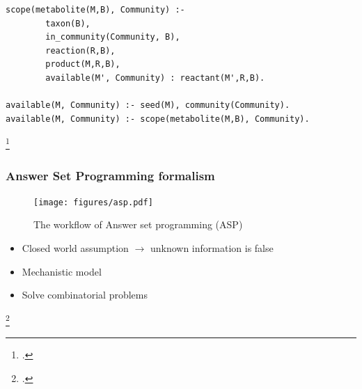 \documentclass[8pt,usenames,dvipsnames]{beamer}
\begin{document}
\begin{frame}[fragile]
\begin{onlyenv}
\begin{minipage}{0.55\textwidth}
\begin{lstlisting}[style=asp]
scope(metabolite(M,B), Community) :-
		taxon(B),
		in_community(Community, B),
		reaction(R,B),
		product(M,R,B),
		available(M', Community) : reactant(M',R,B).

available(M, Community) :- seed(M), community(Community).
available(M, Community) :- scope(metabolite(M,B), Community).

\end{lstlisting}
\end{minipage}
\end{onlyenv}

\footcite{Ebenhoh2004}

\end{frame}

\begin{frame}
\frametitle{Answer Set Programming formalism}
\centering
\begin{figure}[h]
\texttt{[image: figures/asp.pdf]}
\caption{The workflow of Answer set programming (ASP)}
\end{figure}
\begin{block}{}
\begin{itemize}
\item Closed world assumption $\rightarrow$ unknown information is false
\item Mechanistic model
\item Solve combinatorial problems
\end{itemize}

\end{block}
\footcite{Kaufmann2016GroundingAS}
\end{frame}
\end{document}
